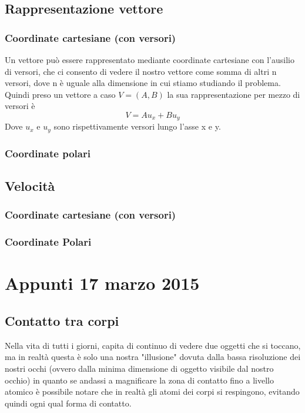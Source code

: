 \documentclass[portrait]{article}
\begin{document}
\subsection{Rappresentazione vettore}
\subsubsection{Coordinate cartesiane (con versori)}
Un vettore può essere rappresentato mediante coordinate cartesiane con l'ausilio di versori, che ci consento di vedere il nostro vettore come somma di altri n versori, dove n è uguale alla dimensione in cui stiamo studiando il problema. Quindi preso un vettore a caso $V = (A,B)$ la sua rappresentazione per mezzo di versori è 
$$V = Au_x + Bu_y$$
Dove $u_x$ e $u_y$ sono rispettivamente versori lungo l'asse x e y.
\subsubsection{Coordinate polari}
\subsection{Velocità}
\subsubsection{Coordinate cartesiane (con versori)}
\subsubsection{Coordinate Polari}
\section{Appunti 17 marzo 2015}
\subsection{Contatto tra corpi}
Nella vita di tutti i giorni, capita di continuo di vedere due oggetti che si toccano, ma in realtà questa è solo una nostra "illusione" dovuta dalla bassa risoluzione dei nostri occhi (ovvero dalla minima dimensione di oggetto visibile dal nostro occhio) in quanto se andassi a magnificare la zona di contatto fino a livello atomico è possibile notare che in realtà gli atomi dei corpi si respingono, evitando quindi ogni qual forma di contatto.
\end{document}

